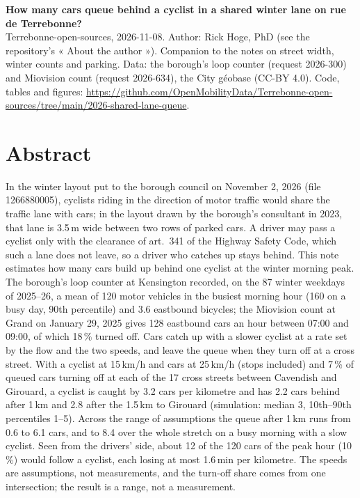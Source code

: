 \documentclass[11pt,a4paper]{article}
\begin{document}
{\LARGE\textbf{How many cars queue behind a cyclist in a shared winter lane on rue de Terrebonne?}}\\[4pt]
{\small Terrebonne-open-sources, 2026-11-08. Author: Rick Hoge, PhD (see the repository\textquoteright{}s « About the author »). Companion to the notes on street width, winter counts and parking. Data: the borough\textquoteright{}s loop counter (request 2026-300) and Miovision count (request 2026-634), the City géobase (CC-BY 4.0). Code, tables and figures: \url{https://github.com/OpenMobilityData/Terrebonne-open-sources/tree/main/2026-shared-lane-queue}.}

\section*{Abstract}
In the winter layout put to the borough council on November 2, 2026 (file 1266880005), cyclists riding in the direction of motor traffic would share the traffic lane with cars; in the layout drawn by the borough\textquoteright{}s consultant in 2023, that lane is 3.5\,m wide between two rows of parked cars. A driver may pass a cyclist only with the clearance of art.~341 of the Highway Safety Code, which such a lane does not leave, so a driver who catches up stays behind. This note estimates how many cars build up behind one cyclist at the winter morning peak. The borough\textquoteright{}s loop counter at Kensington recorded, on the 87 winter weekdays of 2025--26, a mean of 120 motor vehicles in the busiest morning hour (160 on a busy day, 90th percentile) and 3.6 eastbound bicycles; the Miovision count at Grand on January 29, 2025 gives 128 eastbound cars an hour between 07:00 and 09:00, of which 18\,\% turned off. Cars catch up with a slower cyclist at a rate set by the flow and the two speeds, and leave the queue when they turn off at a cross street. With a cyclist at 15\,km/h and cars at 25\,km/h (stops included) and 7\,\% of queued cars turning off at each of the 17 cross streets between Cavendish and Girouard, a cyclist is caught by 3.2 cars per kilometre and has 2.2 cars behind after 1\,km and 2.8 after the 1.5\,km to Girouard (simulation: median 3, 10th--90th percentiles 1--5). Across the range of assumptions the queue after 1\,km runs from 0.6 to 6.1 cars, and to 8.4 over the whole stretch on a busy morning with a slow cyclist. Seen from the drivers\textquoteright{} side, about 12 of the 120 cars of the peak hour (10\,\%) would follow a cyclist, each losing at most 1.6\,min per kilometre. The speeds are assumptions, not measurements, and the turn-off share comes from one intersection; the result is a range, not a measurement.
\end{document}

